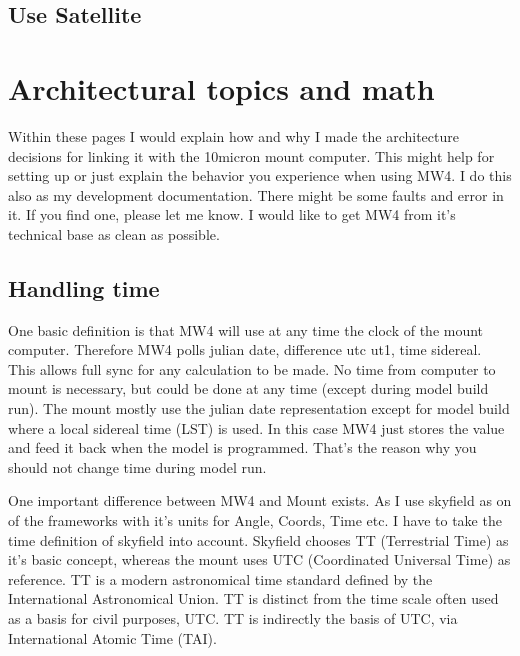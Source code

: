 \documentclass[a4paper,10pt,english]{sphinxmanual}
\begin{document}
\subsection{Use Satellite}
\label{\detokenize{using/satellite/index:use-satellite}}\label{\detokenize{using/satellite/index::doc}}
\sphinxstepscope


\section{Architectural topics and math}
\label{\detokenize{architecture/index:architectural-topics-and-math}}\label{\detokenize{architecture/index::doc}}
\sphinxAtStartPar
Within these pages I would explain how and why I made the architecture decisions
for linking it with the 10micron mount computer. This might help for setting up or
just explain the behavior you experience when using MW4. I do this also as my
development documentation. There might be some faults and error in it. If you find
one, please let me know. I would like to get MW4 from it’s technical base as clean
as possible.

\sphinxstepscope


\subsection{Handling time}
\label{\detokenize{architecture/a_time:handling-time}}\label{\detokenize{architecture/a_time::doc}}
\sphinxAtStartPar
One basic definition is that MW4 will use at any time the clock of the mount
computer. Therefore MW4 polls julian date, difference utc \sphinxhyphen{} ut1, time sidereal.
This allows full sync for any calculation to be made. No time from computer to
mount is necessary, but could be done at any time (except during model build run).
The mount mostly use the julian date representation except for model build where a
local sidereal time (LST) is used. In this case MW4 just stores the value and feed
it back when the model is programmed. That’s the reason why you should not change
time during model run.


\sphinxAtStartPar
One important difference between MW4 and Mount exists. As I use skyfield as on of
the frameworks with it’s units for Angle, Coords, Time etc. I have to take the
time definition of skyfield into account. Skyfield chooses TT (Terrestrial Time) as
it’s basic concept, whereas the mount uses UTC (Coordinated Universal Time) as
reference. TT is a modern astronomical time standard defined by the International
Astronomical Union. TT is distinct from the time scale often used as a basis for
civil purposes, UTC. TT is indirectly the basis of UTC, via International Atomic
Time (TAI).
\end{document}
